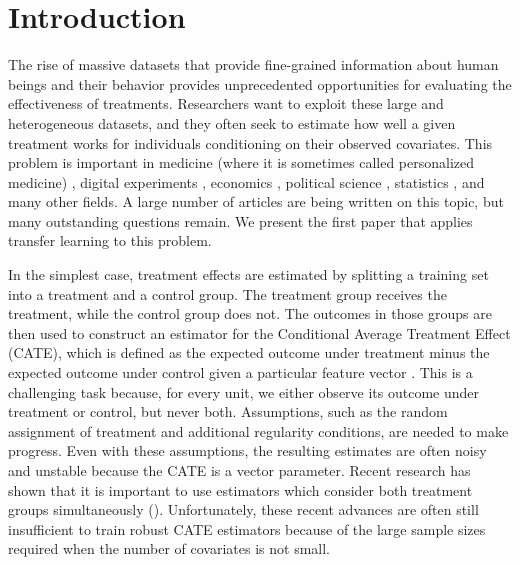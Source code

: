 \section{Introduction} \label{section:Introduction}

The rise of massive datasets that provide fine-grained information about human beings and their behavior provides unprecedented opportunities for evaluating the effectiveness of treatments. Researchers want to exploit these large and heterogeneous datasets, and they often seek to estimate how well a given treatment works for individuals conditioning on their observed covariates. This problem is important in medicine (where it is sometimes called personalized medicine) \citep{Henderson2016,powers2018some}, digital experiments \citep{taddy2016nonparametric}, economics \citep{Athey2016}, political science \citep{green2012modeling}, statistics
\citep{tian2014simple}, and many other fields. A large number of articles are being written on this topic, but many outstanding questions remain. We present the first paper that applies transfer learning to this problem.


In the simplest case, treatment effects are estimated by splitting a training set into a treatment and a control group. The treatment group receives the treatment, while the control group does not. The outcomes in those groups are then used to construct an estimator for the Conditional Average Treatment Effect (CATE), which is defined as the expected outcome under treatment minus the expected outcome under control given a particular feature vector \citep{athey2015machine}. This is a challenging task because, for every unit, we either observe its outcome under treatment or control, but never both. Assumptions, such as the random assignment of treatment and additional regularity conditions, are needed to make progress. Even with these assumptions, the resulting estimates are often noisy and unstable because the CATE is a vector parameter. Recent research has shown that it is important to use estimators which consider both treatment groups simultaneously %
(\cite{kunzel2017meta, wager2015estimation, nie2017learning, hill2011bayesian}). Unfortunately, these recent advances are often still insufficient to train robust CATE estimators because of the large sample sizes required when the number of covariates is not small.


